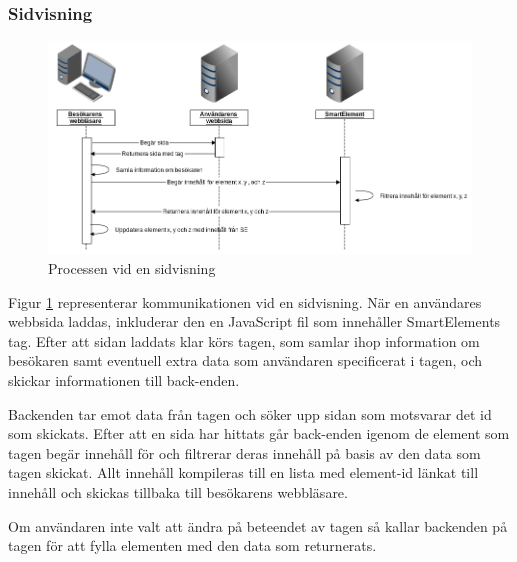 \subsubsection{Sidvisning}

\begin{figure}[h!]
\centering
\includegraphics[width=150mm]{assets/images/smelementactivity.png}
\caption{Processen vid en sidvisning}
\label{pageviewprocess}
\end{figure}

Figur \ref{pageviewprocess} representerar kommunikationen vid en sidvisning. När en användares webbsida laddas, inkluderar den en JavaScript fil som innehåller SmartElements tag. Efter att sidan laddats klar körs tagen, som samlar ihop information om besökaren samt eventuell extra data som användaren specificerat i tagen, och skickar informationen till back-enden.

Backenden tar emot data från tagen och söker upp sidan som motsvarar det id som skickats. Efter att en sida har hittats går back-enden igenom de element som tagen begär innehåll för och filtrerar deras innehåll på basis av den data som tagen skickat. Allt innehåll kompileras till en lista med element-id länkat till innehåll och skickas tillbaka till besökarens webbläsare.

Om användaren inte valt att ändra på beteendet av tagen så kallar backenden på tagen för att fylla elementen med den data som returnerats.